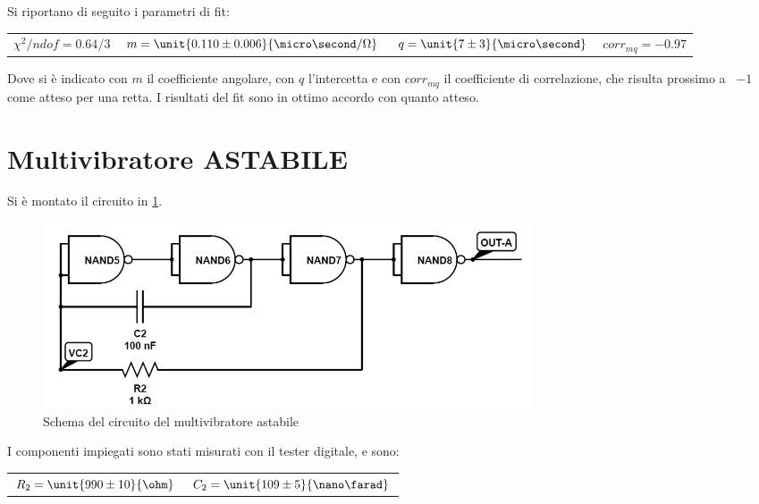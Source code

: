 \documentclass[a4paper,10pt]{article}
\begin{document}
Si riportano di seguito i parametri di fit:

\begin{table}[H]
	\centering
	\begin{tabular}{cccc}
		$\chi^2/ndof = 0.64/3$ & $m = \unit{ 0.110\pm0.006 }{\micro\second / \Omega}$ & $q = \unit{ 7\pm3 }{\micro\second}$ & $corr_{mq} = -0.97 $\\
	\end{tabular}
\end{table}

Dove si è indicato con $m$ il coefficiente angolare, con $q$ l'intercetta e con $corr_{mq}$ il coefficiente di correlazione, che risulta prossimo a ~$-1$ come atteso per una retta. I risultati del fit sono in ottimo accordo con quanto atteso.

\pagebreak[2]
\section{Multivibratore ASTABILE}

Si è montato il circuito in \cref{fig:AST}.

\begin{figure}[H]
	\centering
	\includegraphics[width=0.7\textwidth]{../grafici/Astabile.png}
	\caption{Schema del circuito del multivibratore astabile}
	\label{fig:AST}
\end{figure}

I componenti impiegati sono stati misurati con il tester digitale, e sono:

\begin{table}[H]
	\centering
	\begin{tabular}{cc}
		$R_2 = \unit{990 \pm 10}{\ohm}$ & $C_2 = \unit{109 \pm 5}{\nano\farad}$\\
	\end{tabular}
\end{table}
\end{document}
